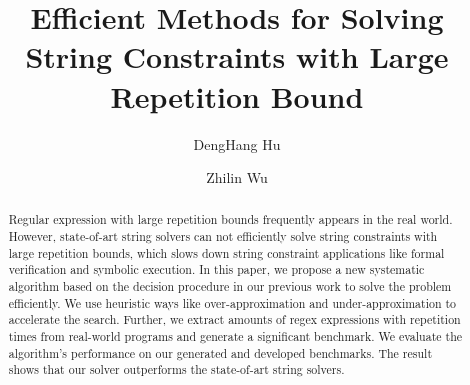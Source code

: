 \documentclass[sigconf]{acmart}
\begin{document}
\title{Efficient Methods for Solving String Constraints with Large Repetition Bound}

\author{DengHang Hu}

\author{Zhilin Wu}



\begin{abstract}
  Regular expression with large repetition bounds frequently appears in the real world. However, state-of-art string solvers can not efficiently solve string constraints with large
  repetition bounds, which slows down string constraint
  applications like formal verification and symbolic execution. In this paper, we
  propose a new systematic algorithm based on the decision procedure in our previous work to solve the problem efficiently. We use
  heuristic ways like over-approximation and under-approximation to accelerate the search. Further, we extract amounts of regex expressions with repetition
  times from real-world programs and generate a significant benchmark. We evaluate the algorithm's performance on our generated
  and developed benchmarks. The result shows that our solver outperforms the state-of-art string solvers.

\end{abstract}

\end{document}
